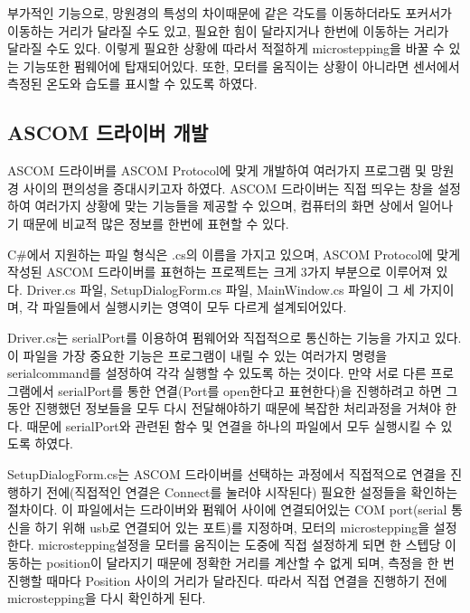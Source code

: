 부가적인 기능으로, 망원경의 특성의 차이때문에 같은 각도를 이동하더라도 포커서가 이동하는 거리가 달라질 수도 있고, 필요한 힘이 달라지거나 한번에 이동하는 거리가 달라질 수도 있다. 이렇게 필요한 상황에 따라서 적절하게 microstepping을 바꿀 수 있는 기능또한 펌웨어에 탑재되어있다. 또한, 모터를 움직이는 상황이 아니라면 센서에서 측정된 온도와 습도를 표시할 수 있도록 하였다.

\subsection{ASCOM 드라이버 개발}

ASCOM 드라이버를 ASCOM Protocol에 맞게 개발하여 여러가지 프로그램 및 망원경 사이의 편의성을 증대시키고자 하였다. ASCOM 드라이버는 직접 띄우는 창을 설정하여 여러가지 상황에 맞는 기능들을 제공할 수 있으며, 컴퓨터의 화면 상에서 일어나기 때문에 비교적 많은 정보를 한번에 표현할 수 있다.

C\#에서 지원하는 파일 형식은 .cs의 이름을 가지고 있으며, ASCOM Protocol에 맞게 작성된 ASCOM 드라이버를 표현하는 프로젝트는 크게 3가지 부분으로 이루어져 있다. Driver.cs 파일, SetupDialogForm.cs 파일, MainWindow.cs 파일이 그 세 가지이며, 각 파일들에서 실행시키는 영역이 모두 다르게 설계되어있다.

Driver.cs는 serialPort를 이용하여 펌웨어와 직접적으로 통신하는 기능을 가지고 있다. 이 파일을 가장 중요한 기능은 프로그램이 내릴 수 있는 여러가지 명령을 serialcommand를 설정하여 각각 실행할 수 있도록 하는 것이다. 만약 서로 다른 프로그램에서 serialPort를 통한 연결(Port를 open한다고 표현한다)을 진행하려고 하면 그동안 진행했던 정보들을 모두 다시 전달해야하기 때문에 복잡한 처리과정을 거쳐야 한다. 때문에 serialPort와 관련된 함수 및 연결을 하나의 파일에서 모두 실행시킬 수 있도록 하였다.

SetupDialogForm.cs는 ASCOM 드라이버를 선택하는 과정에서 직접적으로 연결을 진행하기 전에(직접적인 연결은 Connect를 눌러야 시작된다) 필요한 설정들을 확인하는 절차이다. 이 파일에서는 드라이버와 펌웨어 사이에 연결되어있는 COM port(serial 통신을 하기 위해 usb로 연결되어 있는 포트)를 지정하며, 모터의 microstepping을 설정한다. microstepping설정을 모터를 움직이는 도중에 직접 설정하게 되면 한 스텝당 이동하는 position이 달라지기 때문에 정확한 거리를 계산할 수 없게 되며, 측정을 한 번 진행할 때마다 Position 사이의 거리가 달라진다. 따라서 직접 연결을 진행하기 전에 microstepping을 다시 확인하게 된다.

